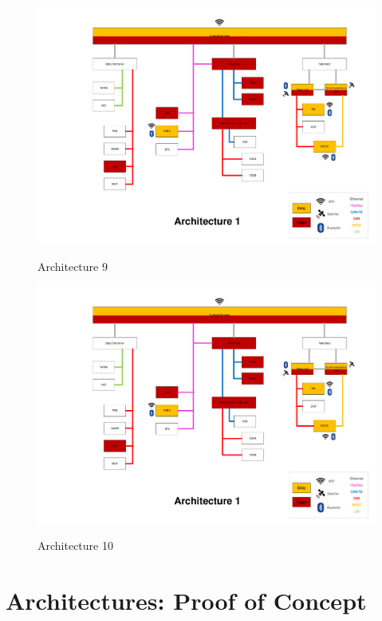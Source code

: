 \begin{figure}[h]
    \centering
    \caption{Architecture 9}
    \includegraphics[width=\textwidth, page=9]{../Architectures-survey.pdf}
    \label{fig:architecture9}
\end{figure}

\begin{figure}[h]
    \centering
    \caption{Architecture 10}
    \includegraphics[width=\textwidth, page=10]{../Architectures-survey.pdf}
    \label{fig:architecture10}
\end{figure}


\chapter{Architectures: Proof of Concept}
\label{fig:pocarch}

